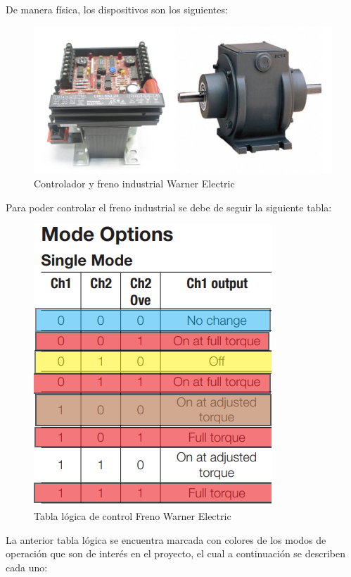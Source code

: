 \documentclass[12pt,titlepage]{article}
\begin{document}
De manera física, los dispositivos son los siguientes: \\
\begin{figure}[htbp]
\hspace*{2.2cm} 
\includegraphics[scale=0.13]{warner_devices}
\caption{Controlador y freno industrial Warner Electric}
\end{figure}
\newpage
Para poder controlar el freno industrial se debe de seguir la siguiente tabla: \\
 
\begin{figure}[htbp]
\hspace*{5.2cm} 
\includegraphics[scale=0.69]{modos_freno}
\caption{Tabla lógica de control Freno Warner Electric}
\end{figure}

La anterior tabla lógica se encuentra marcada con colores de los modos de operación que son de interés en el proyecto, el cual a continuación se describen cada uno: 
\end{document}
